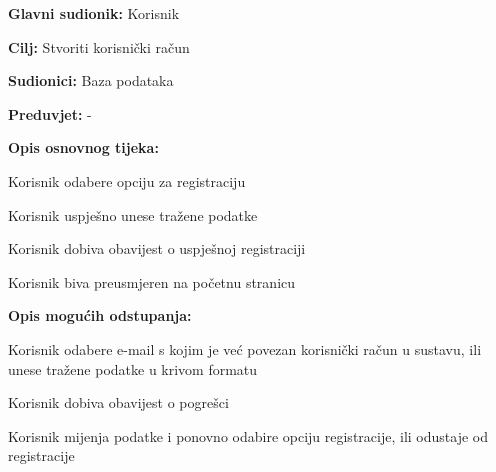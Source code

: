 					\noindent {}
					\begin{packed_item}
	
						\item \textbf{Glavni sudionik: }Korisnik
						\item  \textbf{Cilj:} Stvoriti korisnički račun
						\item  \textbf{Sudionici:} Baza podataka
						\item  \textbf{Preduvjet:} -
						\item  \textbf{Opis osnovnog tijeka:}
						
						\item[] \begin{packed_enum}
	
							\item Korisnik odabere opciju za registraciju
							\item Korisnik uspješno unese tražene podatke
							\item Korisnik dobiva obavijest o uspješnoj registraciji
							\item Korisnik biva preusmjeren na početnu stranicu
						\end{packed_enum}
						
						\item  \textbf{Opis mogućih odstupanja:}
						
						\item[] \begin{packed_item}
	
							\item[2.a] Korisnik odabere e-mail s kojim je već povezan korisnički račun u sustavu, ili unese tražene podatke u krivom formatu
							\item[] \begin{packed_enum}
								
								\item Korisnik dobiva obavijest o pogrešci
								\item Korisnik mijenja podatke i ponovno odabire opciju registracije, ili odustaje od registracije
								
							\end{packed_enum}
							
						\end{packed_item}
					\end{packed_item}
					
